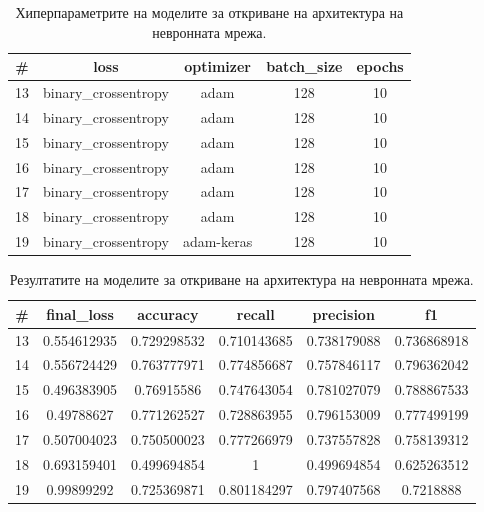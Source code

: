 \documentclass{article}
\begin{document}
\begin{table}[H]
\centering
\captionsetup{justification=centering}
\begin{tabular}{|c||c|c|c|c|}
\hline
\# & loss & optimizer & batch\_size & epochs\\
\hline
13 & binary\_crossentropy & adam & 128 & 10\\
14 & binary\_crossentropy & adam & 128 & 10\\
15 & binary\_crossentropy & adam & 128 & 10\\
16 & binary\_crossentropy & adam & 128 & 10\\
17 & binary\_crossentropy & adam & 128 & 10\\
18 & binary\_crossentropy & adam & 128 & 10\\
19 & binary\_crossentropy & adam-keras & 128 & 10\\
\hline
\end{tabular}
\caption{Хиперпараметрите на моделите за откриване на архитектура на невронната мрежа.}
\end{table}

\begin{table}[H]
\centering
\captionsetup{justification=centering}
\begin{tabular}{|c||c|c|c|c|c|}
\hline
\# & final\_loss & accuracy & recall & precision & f1\\
\hline
13 & 0.554612935 & 0.729298532 & 0.710143685 & 0.738179088 & 0.736868918\\
14 & 0.556724429 & 0.763777971 & 0.774856687 & 0.757846117 & 0.796362042\\
15 & 0.496383905 & 0.76915586 & 0.747643054 & 0.781027079 & 0.788867533\\
16 & 0.49788627 & 0.771262527 & 0.728863955 & 0.796153009 & 0.777499199\\
17 & 0.507004023 & 0.750500023 & 0.777266979 & 0.737557828 & 0.758139312\\
18 & 0.693159401 & 0.499694854 & 1 & 0.499694854 & 0.625263512\\
19 & 0.99899292 & 0.725369871 & 0.801184297 & 0.797407568 & 0.7218888\\
\hline
\end{tabular}
\caption{Резултатите на моделите за откриване на архитектура на невронната мрежа.}
\end{table}
\end{document}
